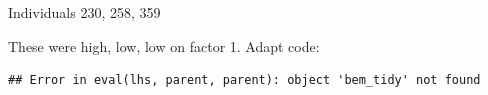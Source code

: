 \documentclass[ignorenonframetext,]{beamer}
\newenvironment{Shaded}{\begin{snugshade}}{\end{snugshade}}
\newcommand{\DecValTok}[1]{\textcolor[rgb]{0.00,0.00,0.81}{#1}}
\newcommand{\FloatTok}[1]{\textcolor[rgb]{0.00,0.00,0.81}{#1}}
\newcommand{\KeywordTok}[1]{\textcolor[rgb]{0.13,0.29,0.53}{\textbf{#1}}}
\newcommand{\NormalTok}[1]{#1}
\newcommand{\OperatorTok}[1]{\textcolor[rgb]{0.81,0.36,0.00}{\textbf{#1}}}
\newcommand{\StringTok}[1]{\textcolor[rgb]{0.31,0.60,0.02}{#1}}
\begin{document}
\begin{frame}[fragile]{Individuals 230, 258, 359}
\protect\hypertarget{individuals-230-258-359}{}

These were high, low, low on factor 1. Adapt code:

\begin{Shaded}
\end{Shaded}

\begin{verbatim}
## Error in eval(lhs, parent, parent): object 'bem_tidy' not found
\end{verbatim}

\end{frame}
\end{document}
